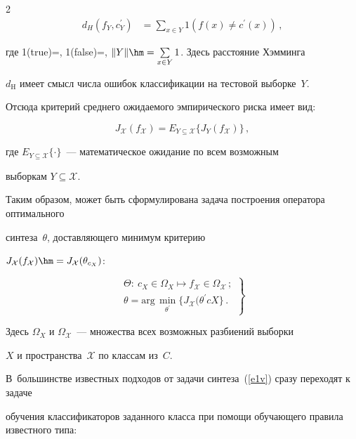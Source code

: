 \begin{multicols}{2}
\begin{align*}
d_H(f_Y, c_Y^\prime) &=\sum\limits_{x\in Y} {1}(f(x)\not= c^\prime(x))\,,

\end{align*}

где 1(true)\;=, 1(false)\;=, $\Vert Y\Vert\hm=\sum\limits_{x\in Y}1$. Здесь расстояние Хэмминга 

$d_{\mathrm{H}}$ имеет смысл числа ошибок классификации на тестовой выборке~$Y$.

Отсюда критерий среднего ожидаемого эмпирического риска имеет вид:

$$

J_{\mathcal{X}}(f_{\mathcal{X}})=E_{Y\subseteq \mathcal{X}} \{J_Y(f_{\mathcal{X}})\}\,,

$$

где $E_{Y\subseteq \mathcal{X}}\{\cdot\}$~--- математическое ожидание по всем возможным 

выборкам $Y\subseteq \mathcal{X}$.



Таким образом, может быть сформулирована задача построения оператора оптимального 

синтеза~$\theta$, доставляющего минимум критерию 

$J_{\mathcal{X}}(f_{\mathcal{X}})\hm=J_{\mathcal{X}}(\theta_{c_X})$:

\begin{equation}

\left.

\begin{array}{l}

\Theta:\ c_X\in \Omega_X\mapsto f_{\mathcal{X}}\in\Omega_{\mathcal{X}}\,;\\[9pt]

\theta=\mathrm{arg}\,\min\limits_{\theta^\prime} \{J_{\mathcal{X}}(\theta^\prime c{X}\}\,.

\end{array}

\right\}

\label{e1v}

\end{equation}

Здесь $\Omega_X$ и $\Omega_{\mathcal{X}}$~--- множества всех возможных разбиений выборки 

$X$ и пространства~$\mathcal{X}$ по классам из~$C$.



В~большинстве известных подходов от задачи синтеза~(\ref{e1v}) сразу переходят к задаче 

обучения классификаторов заданного класса при помощи обучающего правила известного типа:


\end{multicols}

